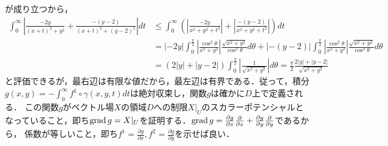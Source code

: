 \documentclass[dvipdfmx,a4paper,uplatex]{jsarticle}
\begin{document}
が成り立つから，
\begin{align*}
    \int^\infty_0 \left| \frac{-2y}{(x+t)^2+y^2} + \frac{-(y-2)}{(x+t)^2+(y-2)^2} \right|dt &\le \int^\infty_0 \left(\left| \frac{-2y}{x^2+y^2+t^2} \right| + \left| \frac{-(y-2)}{x^2+y^2+t^2} \right|\right)dt \\
    &= |-2y|\int^{\frac{\pi}{2}}_0 \left| \frac{\cos^2\theta}{x^2+y^2} \right|\frac{\sqrt{x^2+y^2}}{\cos^2\theta}d\theta + |-(y-2)| \int^{\frac{\pi}{2}}_0 \left| \frac{\cos^2\theta}{x^2+y^2} \right|\frac{\sqrt{x^2+y^2}}{\cos^2\theta}d\theta\\
    &= (2|y|+|y-2|)\int^{\frac{\pi}{2}}_0\left| \frac{1}{\sqrt{x^2+y^2}} \right|d\theta = \frac{\pi}{2}\frac{2|y|+|y-2|}{\sqrt{x^2+y^2}}
\end{align*}
と評価できるが，最右辺は有限な値だから，最左辺は有界である．従って，積分$g(x,y)=-\int^\infty_0f^1\circ\gamma(x,y,t) dt$は絶対収束し，関数$g$は確かに$D$上で定義される．
この関数$g$がベクトル場$X$の領域$D$への制限$X|_U$のスカラーポテンシャルとなっていること，即ち$\operatorname{\mathrm{grad}} g = X|_U$を証明する．$\operatorname{\mathrm{grad}} g=\frac{\partial g}{\partial x}\frac{\partial}{\partial x} + \frac{\partial g}{\partial y}\frac{\partial}{\partial y}$であるから，
係数が等しいこと，即ち$f^1=\frac{\partial g}{\partial x},f^2=\frac{\partial g}{\partial y}$を示せば良い．
\end{document}
